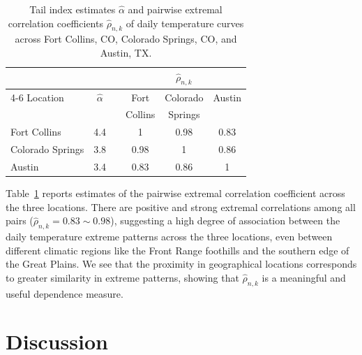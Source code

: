 \documentclass[lineno]{biometrika}
\newcommand \ag{\alpha}
\begin{document}
\begin{table}[t]
\centering
\caption{Tail index estimates $\hat{\ag}$ and pairwise extremal correlation coefficients $\hat{\rho}_{n,k}$ of daily temperature curves across Fort Collins, CO, Colorado Springs, CO, and Austin, TX.
\label{t:3loc}}
\medskip
\begin{tabular}{l|c|cccc}
  \hline\hline
 &  && & $\hat{\rho}_{n,k}$ & \\ \cline{4-6}
Location & $\hat{\ag}$ && Fort & Colorado  & Austin\\
 &  && Collins & Springs & \\
\hline
Fort Collins & 4.4 && 1& 0.98 & 0.83\\
Colorado Springs & 3.8 &&0.98 & 1& 0.86\\
Austin& 3.4 &&0.83 & 0.86 &1\\
\hline\hline
\end{tabular}
\end{table}

Table~\ref{t:3loc} reports estimates of the pairwise  extremal correlation coefficient across the three locations. There are positive and strong extremal correlations among all pairs ($\hat{\rho}_{n,k} = 0.83 \sim 0.98$), suggesting a high degree of association between the daily temperature extreme patterns across the three locations, even between different
climatic regions like the Front Range  foothills and the southern edge of the Great Plains.
We see that the proximity in geographical locations corresponds to greater similarity in extreme patterns, showing that  $\hat{\rho}_{n,k}$ is
a meaningful and useful dependence measure.






\section{Discussion}
\end{document}
